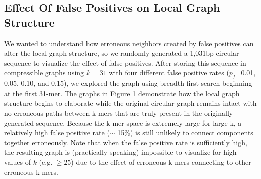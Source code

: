 \documentclass[12pt]{article} \usepackage{simplemargins}
\begin{document}
\subsection{Effect Of False Positives on Local Graph Structure}
We wanted to understand how erroneous neighbors created 
by false positives can alter 
the local graph structure, so we randomly generated a 1,031bp circular sequence 
to visualize the effect of false positives.
After storing this sequence in compressible graphs using $k=31$ with
four different false positive rates ($p_f$=0.01, 0.05, 0.10, and
0.15), we explored the graph using breadth-first search beginning at
the first 31-mer. 
The graphs in Figure 
1 demonstrate how
the local graph structure begins to elaborate while the original circular
graph remains intact with no erroneous paths between k-mers that are
truly present in the originally generated sequence. Because the k-mer
space is extremely large for large k, a relatively high false positive 
rate ($\sim$ 15\%) is still 
unlikely to connect components
together erroneously. Note that when the false positive
rate is sufficiently high, the resulting graph is 
(practically speaking) impossible to visualize for high values of $k$ (e.g. $\ge 25$) 
due to the effect of erroneous k-mers connecting to other erroneous k-mers. 
\end{document}
